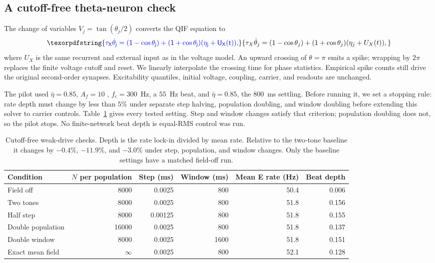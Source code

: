 \documentclass[11pt,a4paper]{article}
\providecommand{\DIFaddtex}[1]{{\protect\color{blue} \sf #1}} %
\providecommand{\DIFdeltex}[1]{{\protect\color{red} \scriptsize #1}} %
\providecommand{\DIFaddbegin}{} %
\providecommand{\DIFaddend}{} %
\providecommand{\DIFdelbegin}{} %
\providecommand{\DIFdelend}{} %
\providecommand{\DIFadd}[1]{\texorpdfstring{\DIFaddtex{#1}}{#1}} %
\providecommand{\DIFdel}[1]{\texorpdfstring{\DIFdeltex{#1}}{}} %
\begin{document}
\subsection{\DIFadd{A cutoff-free theta-neuron check}}\label{supp:theta-pilot}
\DIFadd{The change of variables $V_j=\tan(\theta_j/2)$ converts the QIF equation to
}\[
\DIFadd{\tau_X\dot\theta_j=(1-\cos\theta_j)
 +(1+\cos\theta_j)(\eta_j+U_X(t)),
}\]
\DIFadd{where $U_X$ is the same recurrent and external input as in the voltage model.
An upward crossing of $\theta=\pi$ emits a spike; wrapping by $2\pi$ replaces
the finite voltage cutoff and reset. We linearly interpolate the crossing
time for phase statistics. Empirical spike counts still drive the original
second-order synapses. Excitability quantiles, initial voltage, coupling,
carrier, and readouts are unchanged.
}

\DIFadd{The pilot used $\bar\eta=0.85$, }\DIFaddend $A_f=10$\DIFaddbegin \DIFadd{, $f_c=300$~Hz, a $55$~Hz beat,
}\DIFaddend and \DIFdelbegin \DIFdel{$\bar\eta=0.85$, the }\DIFdelend \DIFaddbegin \DIFadd{$800$~ms settling. Before running it, we set a stopping rule: rate depth
must change by less than $5\%$ under separate step halving, population
doubling, and window doubling before extending this solver to carrier controls.
Table~\ref{tab:theta-pilot} gives every tested setting. Step and window changes
satisfy that criterion; population doubling does not, so the pilot stops.
No }\DIFaddend finite-network \DIFdelbegin \DIFdel{beat depth is }\DIFdelend \DIFaddbegin \DIFadd{equal-RMS control was run.
}

\begin{table}[htbp]
\color{blue}
\centering\small
\begin{tabular}{@{}lrrrrr@{}}
\toprule
Condition & $N$ per population & Step (ms) & Window (ms) & Mean E rate (Hz) & Beat depth\\
\midrule
Field off & 8000 & 0.0025 & 800 & 50.4 & 0.006\\
Two tones & 8000 & 0.0025 & 800 & 51.8 & 0.156\\
Half step & 8000 & 0.00125 & 800 & 51.8 & 0.155\\
Double population & 16000 & 0.0025 & 800 & 51.8 & 0.137\\
Double window & 8000 & 0.0025 & 1600 & 51.8 & 0.151\\
Exact mean field & $\infty$ & 0.0025 & 800 & 52.1 & 0.128\\
\bottomrule
\end{tabular}
\caption{\color{blue}Cutoff-free weak-drive checks. Depth is the rate lock-in divided by
mean rate. Relative to the two-tone baseline it changes by $-0.4\%$,
$-11.9\%$, and $-3.0\%$ under step, population, and window changes.
Only the baseline settings have a matched field-off run.}
\label{tab:theta-pilot}
\end{table}
\end{document}
